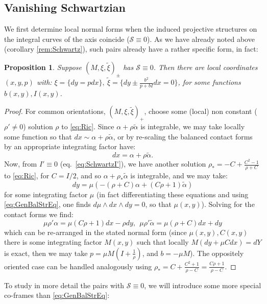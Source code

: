 \documentclass[10pt]{amsart}
\newtheorem{prop}[thm]{Proposition}
\theoremstyle{definition}
\begin{document}
\subsection{Vanishing Schwartzian}  We first determine local normal forms when the induced projective structures on the integral curves of the axis coincide ($\mathcal{S} \equiv 0$).  As we have already noted above (corollary \ref{rem:Schwartz}), such pairs already have a rather specific form, in fact:

\begin{prop}\label{prop:genS0}
    Suppose $(M, \xi, \tilde \xi)_\pm$ has $\mathcal{S} \equiv 0$. Then there are local coordinates $(x,y,p)$ with:  $\xi = \{ dy = pdx\}, ~\tilde \xi = \{ dy \pm \frac{b^2}{p + bI} dx = 0\}$,
    for some functions $b(x,y), I(x,y)$.
\end{prop}

\begin{proof}
For common orientations, $(M, \xi, \tilde \xi)_+$, choose some (local) non constant ($\rho'\ne 0$) solution $\rho$ to \eqref{eq:Ric}. Since $\alpha + \rho\tilde\alpha$ is integrable, we may take locally some function so that $dx \sim \alpha + \rho\tilde\alpha$, or by re-scaling the balanced contact forms by an appropriate integrating factor have:
    \[ dx = \alpha + \rho \tilde\alpha. \]
   Now, from $I' \equiv 0$ (eq.~\eqref{eq:SchwartzI'}), we have another solution $\rho_* = - C + \frac{C^2 - 1}{\rho + C}$ to \eqref{eq:Ric}, for $C = I/2$, and so $\alpha + \rho_* \tilde\alpha$ is integrable, and we may take:
   \[ dy = \mu (-(\rho + C)\alpha + (C\rho + 1) \tilde\alpha) \]
   for some integrating factor $\mu$ (in fact differentiating these equations and using \eqref{eq:GenBalStrEq}, one finds $d\mu\wedge dx\wedge dy = 0$, so that $\mu(x,y)$). Solving for the contact forms we find:
   \[ \mu\rho'\alpha = \mu(C\rho + 1) dx - \rho dy, ~~\mu\rho' \tilde\alpha = \mu(\rho + C) dx + dy\]
   which can be re-arranged in the stated normal form (since $\mu(x,y), C(x,y)$ there is some integrating factor $M(x,y)$ such that locally $M( dy + \mu C dx) = dY$ is exact, then we may take $p = \mu M (I + \frac{1}{\rho})$, and $b = -\mu M$). The oppositely oriented case can be handled analogously using $\rho_* = C + \frac{C^2 + 1}{\rho - C} = \frac{C\rho + 1}{\rho - C}$.
\end{proof} 


To study in more detail the pairs with $\mathcal{S}\equiv 0$, we will introduce some more special co-frames than \eqref{eq:GenBalStrEq}: 
\end{document}
